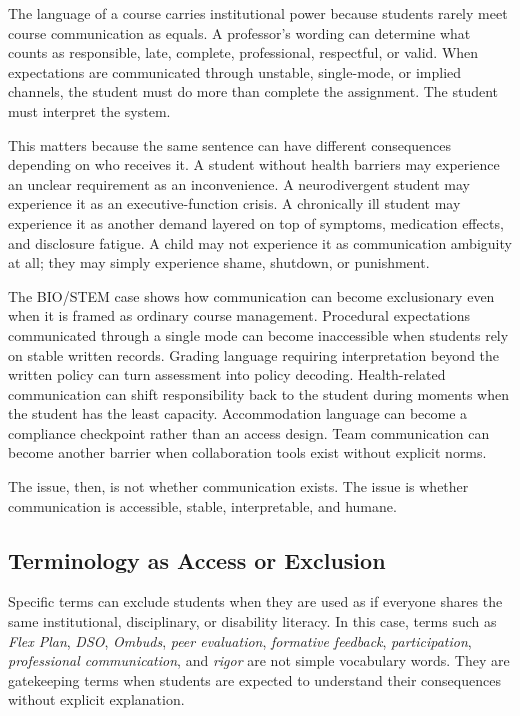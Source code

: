 The language of a course carries institutional power because students rarely meet course communication as equals. A professor's wording can determine what counts as responsible, late, complete, professional, respectful, or valid. When expectations are communicated through unstable, single-mode, or implied channels, the student must do more than complete the assignment. The student must interpret the system.

This matters because the same sentence can have different consequences depending on who receives it. A student without health barriers may experience an unclear requirement as an inconvenience. A neurodivergent student may experience it as an executive-function crisis. A chronically ill student may experience it as another demand layered on top of symptoms, medication effects, and disclosure fatigue. A child may not experience it as communication ambiguity at all; they may simply experience shame, shutdown, or punishment.

The BIO/STEM case shows how communication can become exclusionary even when it is framed as ordinary course management. Procedural expectations communicated through a single mode can become inaccessible when students rely on stable written records. Grading language requiring interpretation beyond the written policy can turn assessment into policy decoding. Health-related communication can shift responsibility back to the student during moments when the student has the least capacity. Accommodation language can become a compliance checkpoint rather than an access design. Team communication can become another barrier when collaboration tools exist without explicit norms.

The issue, then, is not whether communication exists. The issue is whether communication is accessible, stable, interpretable, and humane.

\subsection*{Terminology as Access or Exclusion}

Specific terms can exclude students when they are used as if everyone shares the same institutional, disciplinary, or disability literacy. In this case, terms such as \textit{Flex Plan}, \textit{DSO}, \textit{Ombuds}, \textit{peer evaluation}, \textit{formative feedback}, \textit{participation}, \textit{professional communication}, and \textit{rigor} are not simple vocabulary words. They are gatekeeping terms when students are expected to understand their consequences without explicit explanation.

